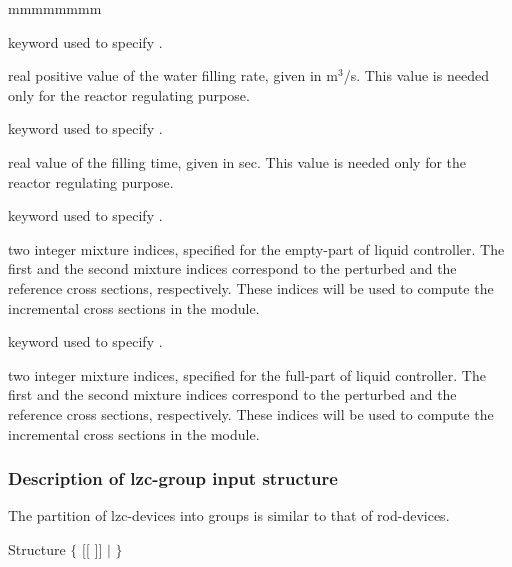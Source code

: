 \begin{ListeDeDescription}{mmmmmmmm}
\item[\moc{RATE}] keyword used to specify .

\item[\dusa{rate}] real positive value of the water filling rate, given in
m$^{3}$/s. This value is needed only for the reactor regulating purpose.

\item[\moc{TIME}] keyword used to specify .

\item[\dusa{time}] real value of the filling time, given in sec.
This value is needed only for the reactor regulating purpose.

\item[\moc{EMPTY-MIX}] keyword used to specify .

\item[\dusa{mixE}] two integer mixture indices, specified for the empty-part of
liquid controller. The first and the second mixture indices correspond to the
perturbed and the reference cross sections, respectively. These indices will be
used to compute the incremental cross sections in the  module.

\item[\moc{FULL-MIX}] keyword used to specify .

\item[\dusa{mixF}] two integer mixture indices, specified for the full-part of liquid
controller. The first and the second mixture indices correspond to the perturbed
and the reference cross sections, respectively. These indices will be used
to compute the incremental cross sections in the  module.

\end{ListeDeDescription}
\clearpage

\subsubsection{Description of lzc-group input structure}\label{sect:lzcgroupstr}

The partition of lzc-devices into groups is similar to that of rod-devices.

\begin{DataStructure}{Structure }
  $\{$ 
$[[$  $]]$  $|$   $\}$
\end{DataStructure}


